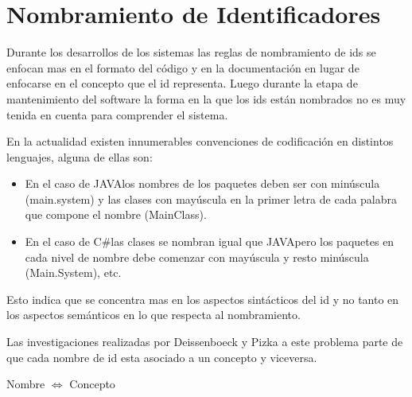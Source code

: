 \documentclass[12pt]{report}
\begin{document}



\section{Nombramiento de Identificadores}

Durante los desarrollos de los sistemas las reglas de nombramiento de ids se enfocan mas en el formato del código y en la documentación en lugar de enfocarse en el concepto que el id representa. Luego durante la etapa de mantenimiento del software la forma en la que los ids están nombrados no es muy tenida en cuenta para comprender el sistema.

En la actualidad existen innumerables convenciones de codificación en distintos lenguajes, alguna de ellas son:

\begin{itemize}
\itemsep0em%
\item En el caso de JAVA\texttrademark los nombres de los paquetes deben ser con minúscula (main.system) y las clases con mayúscula en la primer letra de cada palabra que compone el nombre (MainClass).

\item En el caso de C\#\texttrademark las clases se nombran igual que JAVA\texttrademark pero los paquetes en cada nivel de nombre debe comenzar con mayúscula y resto minúscula (Main.System), etc.
\end{itemize}

Esto indica que se concentra mas en los aspectos sintácticos del id y no tanto en los aspectos semánticos en lo que respecta al nombramiento. 

Las investigaciones realizadas por Deissenboeck y Pizka \cite{DFPM05} a este problema parte de que cada nombre de id esta asociado a un concepto y viceversa. 

\begin{center}
\textsf{Nombre $\Leftrightarrow$ Concepto}
\end{center} 
\end{document}
